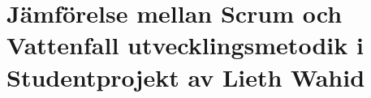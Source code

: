 \chapter{Jämförelse mellan Scrum och Vattenfall utvecklingsmetodik i Studentprojekt  av Lieth Wahid}
\label{individual:lieth-wahid}








